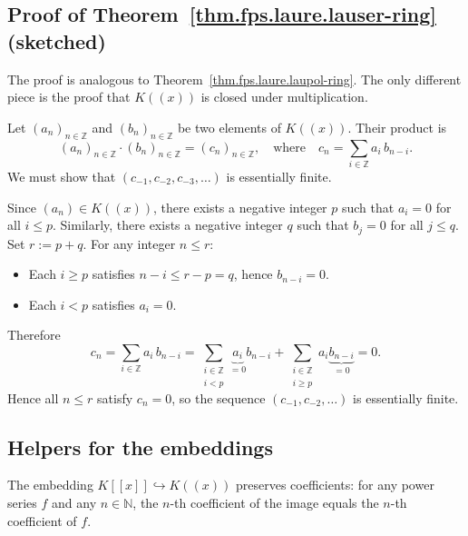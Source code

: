 \subsection{Proof of Theorem~\ref{thm.fps.laure.lauser-ring} (sketched)}

The proof is analogous to Theorem~\ref{thm.fps.laure.laupol-ring}.
The only different piece is the proof that $K\left(\left(x\right)\right)$
is closed under multiplication.

Let $\left(a_n\right)_{n \in \mathbb{Z}}$ and
$\left(b_n\right)_{n \in \mathbb{Z}}$ be two elements of
$K\left(\left(x\right)\right)$. Their product is
\[
  \left(a_n\right)_{n \in \mathbb{Z}} \cdot \left(b_n\right)_{n \in \mathbb{Z}}
  = \left(c_n\right)_{n \in \mathbb{Z}},
  \quad \text{where} \quad
  c_n = \sum_{i \in \mathbb{Z}} a_i\,b_{n-i}.
\]
We must show that $\left(c_{-1}, c_{-2}, c_{-3}, \ldots\right)$ is
essentially finite.

Since $\left(a_n\right) \in K\left(\left(x\right)\right)$, there exists
a negative integer $p$ such that $a_i = 0$ for all $i \le p$.
Similarly, there exists a negative integer $q$ such that $b_j = 0$
for all $j \le q$. Set $r := p + q$. For any integer $n \le r$:

\begin{itemize}
\item Each $i \ge p$ satisfies $n - i \le r - p = q$, hence
  $b_{n-i} = 0$.
\item Each $i < p$ satisfies $a_i = 0$.
\end{itemize}

Therefore
\[
  c_n
  = \sum_{i \in \mathbb{Z}} a_i\,b_{n-i}
  = \sum_{\substack{i \in \mathbb{Z} \\ i < p}}
    \underbrace{a_i}_{= 0} b_{n-i}
  + \sum_{\substack{i \in \mathbb{Z} \\ i \ge p}}
    a_i \underbrace{b_{n-i}}_{= 0}
  = 0.
\]
Hence all $n \le r$ satisfy $c_n = 0$, so the sequence
$\left(c_{-1}, c_{-2}, \ldots\right)$ is essentially finite.

\subsection{Helpers for the embeddings}

\begin{lemma}
\label{lem.fps.laure.ps-embed-coeff}
\leanhelper
\leanok
The embedding $K[\![x]\!] \hookrightarrow K(\!(x)\!)$ preserves
coefficients: for any power series $f$ and any $n \in \mathbb{N}$,
the $n$-th coefficient of the image equals the $n$-th coefficient of $f$.
\end{lemma}

